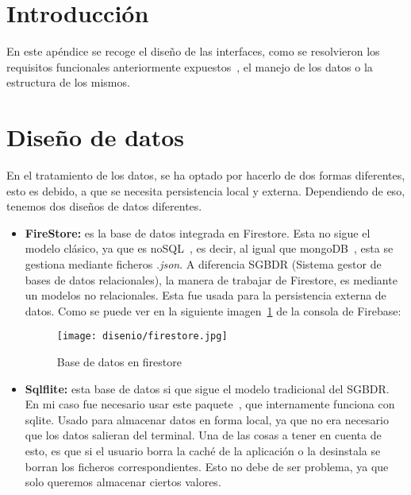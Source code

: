 
\section{Introducción}\label{diseño}
En este apéndice se recoge el diseño de las interfaces, como se resolvieron los requisitos funcionales anteriormente expuestos~\pageref{requisitos}, el manejo de los datos o la estructura de los mismos.

\section{Diseño de datos}
En el tratamiento de los datos, se ha optado por hacerlo de dos formas diferentes, esto es debido, a que se necesita persistencia local y externa. Dependiendo de eso, tenemos dos diseños de datos diferentes.

\begin{itemize}
	\item \textbf{FireStore:} es la base de datos integrada en Firestore. Esta no sigue el modelo clásico, ya que es noSQL~\cite{wiki:nosql}, es decir, al igual que mongoDB~\cite{wiki:mongodb}, esta se gestiona mediante ficheros \emph{.json}. A diferencia SGBDR (Sistema gestor de bases de datos relacionales), la manera de trabajar de Firestore, es mediante un modelos no relacionales. Esta fue usada para la persistencia externa de datos. Como se puede ver en la siguiente imagen~\ref{fig:firestore} de la consola de Firebase:
	
	\begin{figure}[H]
		\centering
		\texttt{[image: disenio/firestore.jpg]}
		\caption{Base de datos en firestore}\label{fig:firestore}
	\end{figure}

	\item\label{sqlflite} \textbf{Sqlflite:} esta base de datos si que sigue el modelo tradicional del SGBDR. En mi caso fue necesario usar este paquete~\cite{package:sqlflite}, que internamente funciona con sqlite. Usado para almacenar datos en forma local, ya que no era necesario que los datos salieran del terminal. Una de las cosas a tener en cuenta de esto, es que si el usuario borra la caché de la aplicación o la desinstala se borran los ficheros correspondientes. Esto no debe de ser problema, ya que solo queremos almacenar ciertos valores.
	
\end{itemize}

